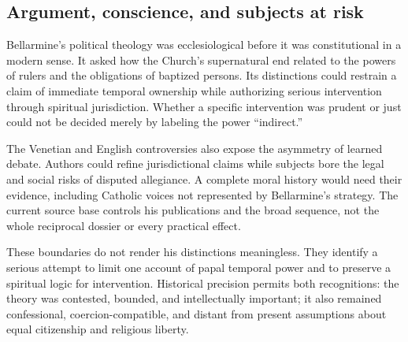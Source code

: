 \subsection{Argument, conscience, and subjects at risk}

Bellarmine's political theology was ecclesiological before it was
constitutional in a modern sense.  It asked how the Church's supernatural end
related to the powers of rulers and the obligations of baptized persons.  Its
distinctions could restrain a claim of immediate temporal ownership while
authorizing serious intervention through spiritual jurisdiction.  Whether a
specific intervention was prudent or just could not be decided merely by
labeling the power ``indirect.''

The Venetian and English controversies also expose the asymmetry of learned
debate.  Authors could refine jurisdictional claims while subjects bore the
legal and social risks of disputed allegiance.  A complete moral history would
need their evidence, including Catholic voices not represented by Bellarmine's
strategy.  The current source base controls his publications and the broad
sequence, not the whole reciprocal dossier or every practical effect.

These boundaries do not render his distinctions meaningless.  They identify a
serious attempt to limit one account of papal temporal power and to preserve a
spiritual logic for intervention.  Historical precision permits both
recognitions: the theory was contested, bounded, and intellectually important;
it also remained confessional, coercion-compatible, and distant from present
assumptions about equal citizenship and religious liberty.

